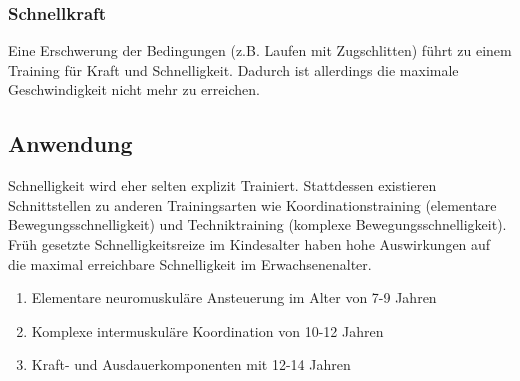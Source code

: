 \subsubsection{Schnellkraft}
Eine Erschwerung der Bedingungen (z.B. Laufen mit Zugschlitten) führt zu einem Training für Kraft und Schnelligkeit.
Dadurch ist allerdings die maximale Geschwindigkeit nicht mehr zu erreichen.

\subsection{Anwendung}
Schnelligkeit wird eher selten explizit Trainiert.
Stattdessen existieren Schnittstellen zu anderen Trainingsarten wie Koordinationstraining (elementare Bewegungsschnelligkeit) und Techniktraining (komplexe Bewegungsschnelligkeit).\\
Früh gesetzte Schnelligkeitsreize im Kindesalter haben hohe Auswirkungen auf die maximal erreichbare Schnelligkeit im Erwachsenenalter.
\begin{enumerate}
    \item Elementare neuromuskuläre Ansteuerung im Alter von 7-9 Jahren
    \item Komplexe intermuskuläre Koordination von 10-12 Jahren
    \item Kraft- und Ausdauerkomponenten mit 12-14 Jahren
\end{enumerate}
